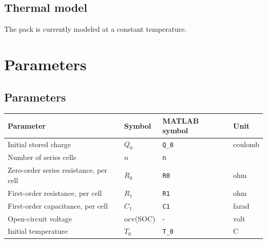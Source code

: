 \documentclass{article}
\begin{document}
	\subsection{Thermal model}
		The pack is currently modeled at a constant temperature.
	

		
		

\section{Parameters}
	\subsection{Parameters}
	\begin{tabular}{ l | l | l | l }
		Parameter						&	Symbol		& MATLAB symbol	&	Unit		\\	\hline
		Initial stored charge					&	$Q_0$		& \texttt{Q\_0}		&	coulomb	\\
		Number of series cells				&	$n$			& \texttt{n}		&			\\
		Zero-order series resistance, per cell	&	$R_0$		& \texttt{R0}		&	ohm		\\
		First-order resistance, per cell			&	$R_1$		& \texttt{R1}		& 	ohm		\\
		First-order capacitance, per cell		&	$C_1$		& \texttt{C1}		&	farad	\\
		Open-circuit voltage					&	ocv(SOC)		& -				&	volt		\\
		Initial temperature					&	$T_0$		& \texttt{T\_0}		&	\degree C \\
		
	\end{tabular}
	
\end{document}
